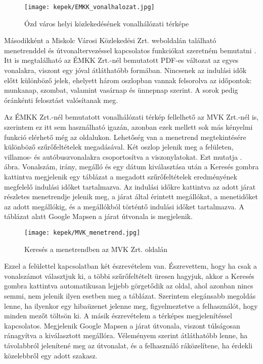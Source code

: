 \begin{figure}[h!]
\centering
\texttt{[image: kepek/EMKK\_vonalhalozat.jpg]}
\caption{Ózd város helyi közlekedésének vonalhálózati térképe}
\label{fig:EMKK_vonalhalozat}
\end{figure}

Másodikként a Miskolc Városi Közlekedési Zrt. weboldalán található menetrenddel és útvonaltervezéssel kapcsolatos funkciókat szeretném bemutatni \cite{mvk}. Itt is megtalálható az ÉMKK Zrt.-nél bemutatott PDF-es változat az egyes vonalakra, viszont egy jóval átláthatóbb formában. Nincsenek az indulási idők előtt különböző jelek, ehelyett három oszlopban vannak felsorolva az időpontok: munkanap, szombat, valamint vasárnap és ünnepnap szerint. A sorok pedig óránkénti felosztást valósítanak meg.

Az ÉMKK Zrt.-nél bemutatott vonalhálózati térkép fellelhető az MVK Zrt.-nél is, szerintem ez itt sem használható igazán, azonban ezek mellett sok más kényelmi funkció elérhető még az oldalukon. Lehetőség van a menetrend megtekintésére különböző szűrőfeltételek megadásával. Két oszlop jelenik meg a felületen, villamos- és autóbuszvonalakra csoportosítva a viszonylatokat. Ezt mutatja . ábra. Vonalszám, irány, megálló és egy dátum kiválasztása után a Keresés gombra kattintva megjelenik egy táblázat a megadott szűrőfeltételek eredményének megfelelő indulási időket tartalmazva. Az indulási időkre kattintva az adott járat részletes menetrendje jelenik meg, a járat által érintett megállókat, a menetidőket az adott megállókig, és a megállókból történtő indulási időket tartalmazva. A táblázat alatt Google Mapsen a járat útvonala is megjelenik.

\begin{figure}[h!]
\centering
\texttt{[image: kepek/MVK\_menetrend.jpg]}
\caption{Keresés a menetrendben az MVK Zrt. oldalán}
\label{fig:MVK_menetrend}
\end{figure}

Ezzel a felülettel kapcsolatban két észrevételem van. Észrevettem, hogy ha csak a vonalszámot választjuk ki, a többi szűrőfeltételt üresen hagyjuk, akkor a Keresés gombra kattintva automatikusan lejjebb görgetődik az oldal, ahol azonban nincs semmi, nem jelenik ilyen esetben meg a táblázat. Szerintem elegánsabb megoldás lenne, ha ilyenkor egy hibaüzenet jelenne meg, figyelmeztetve a felhasználót, hogy minden mezőt töltsön ki. A másik észrevételem a térképes megjelenítéssel kapcsolatos. Megjelenik Google Mapsen a járat útvonala, viszont túlságosan ránagyítva a kiválasztott megállóra. Véleményem szerint átláthatóbb lenne, ha távolabbról jelenítené meg az útvonalat, és a felhasználó ráközelítene, ha érdekli közelebbről egy adott szakasz.

